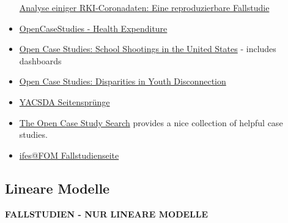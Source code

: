 \documentclass[
  a4paper,
]{scrbook}
\theoremstyle{definition}
\theoremstyle{definition}
\theoremstyle{definition}
\theoremstyle{remark}
\begin{document}
\begin{itemize}
  \href{https://data-se.netlify.app/2021/11/27/analyse-der-rki-coronadaten/}{Analyse
  einiger RKI-Coronadaten: Eine reproduzierbare Fallstudie}
\item
  \href{https://www.opencasestudies.org/casestudies/ocs-healthexpenditure.html}{OpenCaseStudies
  - Health Expenditure}
\item
  \href{https://www.opencasestudies.org/ocs-bp-school-shootings-dashboard/\#Motivation}{Open
  Case Studies: School Shootings in the United States} - includes
  dashboards
\item
  \href{https://www.opencasestudies.org/ocs-bp-youth-disconnection/}{Open
  Case Studies: Disparities in Youth Disconnection}
\item
  \href{https://data-se.netlify.app/2021/05/28/yacsda-seitenspr\%C3\%BCnge/}{YACSDA
  Seitensprünge}
\item
  \href{https://www.opencasestudies.org/}{The Open Case Study Search}
  provides a nice collection of helpful case studies.
\item
  \href{https://fallstudien.netlify.app/}{ifes@FOM Fallstudienseite}
\end{itemize}

\subsection{Lineare Modelle}\label{lineare-modelle}

\textbf{FALLSTUDIEN - NUR LINEARE MODELLE}
\end{document}
